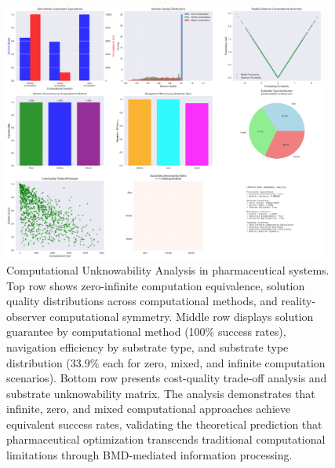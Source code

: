 \begin{figure}[htbp]
\centering
\includegraphics[width=0.95\textwidth]{images/computational_unknowable_analysis_20250925_192139.png}
\caption{Computational Unknowability Analysis in pharmaceutical systems. Top row shows zero-infinite computation equivalence, solution quality distributions across computational methods, and reality-observer computational symmetry. Middle row displays solution guarantee by computational method (100\% success rates), navigation efficiency by substrate type, and substrate type distribution (33.9\% each for zero, mixed, and infinite computation scenarios). Bottom row presents cost-quality trade-off analysis and substrate unknowability matrix. The analysis demonstrates that infinite, zero, and mixed computational approaches achieve equivalent success rates, validating the theoretical prediction that pharmaceutical optimization transcends traditional computational limitations through BMD-mediated information processing.}
\label{fig:computational_unknowable}
\end{figure}

